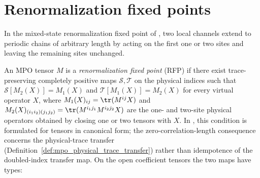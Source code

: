 \section{Renormalization fixed points}

In the mixed-state renormalization fixed point of
\cite[Definition~4.1]{Cirac2016MPDO_arXiv}, two local channels extend to
periodic chains of arbitrary length by acting on the first one or two sites and
leaving the remaining sites unchanged.

\begin{definition}
    \label{def:is_rfp_via_ts}
    \leanok
    An MPO tensor $M$ is a \emph{renormalization fixed point} (RFP) if there exist
    trace-preserving completely positive maps $\mathcal{S}, \mathcal{T}$ on the
    physical indices such that $\mathcal{S}[M_2(X)]=M_1(X)$ and
    $\mathcal{T}[M_1(X)]=M_2(X)$ for every virtual operator $X$, where
    $M_1(X)_{ij}=\tr(M^{ij}X)$ and
    $M_2(X)_{(i_1i_2)(j_1j_2)}=\tr(M^{i_1j_1}M^{i_2j_2}X)$ are the one- and
    two-site physical operators obtained by closing one or two tensors with $X$.
    In \cite[Definition~4.1]{Cirac2016MPDO_arXiv}, this condition is formulated
    for tensors in canonical form; the zero-correlation-length consequence
    concerns the physical-trace transfer (Definition~\ref{def:mpo_physical_trace_transfer})
    rather than idempotence of the doubled-index transfer map.
    On the open coefficient tensors the two maps have types:

\end{definition}
